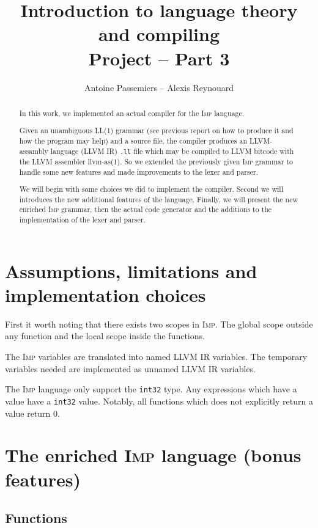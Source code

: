 \documentclass[11pt]{article}
\title{Introduction to language theory and compiling \\ Project -- Part 3}
\author{Antoine Passemiers -- Alexis Reynouard}
\newcommand\imp{\textsc{Imp}\xspace}
\newcommand\inttt{\texttt{int32}\xspace}
\begin{document}
\maketitle
\thispagestyle{empty}

\vfill
\begin{abstract}
In this work, we implemented an actual compiler for the \imp language.

Given an unambiguous LL(1) grammar (see previous report on how to produce it and how the program may help)
and a source file, the compiler produces an LLVM-assambly language (LLVM IR) \texttt{.ll} file which may be compiled to
LLVM bitcode with the LLVM assembler \textsf{llvm-as(1)}.
So we extended the previously given \imp grammar to handle some new features
and made improvements to the lexer and parser.

We will begin with some choices we did to implement the compiler.
Second we will introduces the new additional features of the language.
Finally, we will present the new enriched \imp grammar,
then the actual code generator and the additions to the implementation of the lexer and parser.
\end{abstract}

\vfill
\clearpage
\vfill
\tableofcontents

\vfill
\setcounter{page}{1}

\section{Assumptions, limitations and implementation choices}

First it worth noting that there exists two scopes in \imp.
The global scope outside any function and the local scope inside the functions.

The \imp variables are translated into named LLVM IR variables.
The temporary variables needed are implemented as unnamed LLVM IR variables.

The \imp language only support the \inttt type.
Any expressions which have a value have a \inttt value.
Notably, all functions which does not explicitly return a value return 0.

\section[The enriched \imp language]{The enriched \imp language (bonus features)}

\subsection{Functions}
\end{document}
